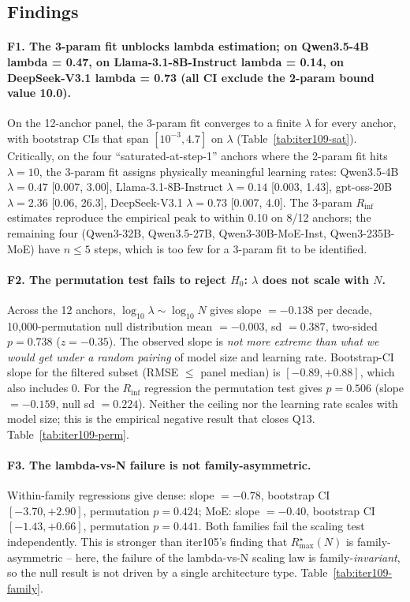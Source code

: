 \subsection*{Findings}

\paragraph{F1. The 3-param fit unblocks lambda estimation; on Qwen3.5-4B lambda = 0.47, on Llama-3.1-8B-Instruct lambda = 0.14, on DeepSeek-V3.1 lambda = 0.73 (all CI exclude the 2-param bound value 10.0).}
On the 12-anchor panel, the 3-param fit converges to a finite $\lambda$ for every anchor, with bootstrap CIs that span $[10^{-3}, 4.7]$ on $\lambda$ (Table~\ref{tab:iter109-sat}).  Critically, on the four ``saturated-at-step-1'' anchors where the 2-param fit hits $\lambda = 10$, the 3-param fit assigns physically meaningful learning rates: Qwen3.5-4B $\lambda = 0.47$ [0.007, 3.00], Llama-3.1-8B-Instruct $\lambda = 0.14$ [0.003, 1.43], gpt-oss-20B $\lambda = 2.36$ [0.06, 26.3], DeepSeek-V3.1 $\lambda = 0.73$ [0.007, 4.0].  The 3-param $R_\mathrm{inf}$ estimates reproduce the empirical peak to within 0.10 on 8/12 anchors; the remaining four (Qwen3-32B, Qwen3.5-27B, Qwen3-30B-MoE-Inst, Qwen3-235B-MoE) have $n \le 5$ steps, which is too few for a 3-param fit to be identified.

\paragraph{F2. The permutation test fails to reject $H_0$: $\lambda$ does not scale with $N$.}
\label{par:f2-lambda-perm}
Across the 12 anchors, $\log_{10}\lambda \sim \log_{10} N$ gives
slope $= -0.138$ per decade, 10{,}000-permutation null distribution
mean $= -0.003$, sd $= 0.387$, two-sided $p = 0.738$ ($z = -0.35$).
The observed slope is \emph{not more extreme than what we would get
under a random pairing} of model size and learning rate.  Bootstrap-CI
slope for the filtered subset (RMSE $\le$ panel median) is
$[-0.89, +0.88]$, which also includes 0.  For the $R_\mathrm{inf}$
regression the permutation test gives $p = 0.506$ (slope $= -0.159$,
null sd $= 0.224$).  Neither the ceiling nor the learning rate scales
with model size; this is the empirical negative result that closes
Q13.  Table~\ref{tab:iter109-perm}.

\paragraph{F3. The lambda-vs-N failure is not family-asymmetric.}
Within-family regressions give dense: slope $= -0.78$, bootstrap CI
$[-3.70, +2.90]$, permutation $p = 0.424$; MoE: slope $= -0.40$,
bootstrap CI $[-1.43, +0.66]$, permutation $p = 0.441$.  Both families
fail the scaling test independently.  This is stronger than iter105's
finding that $R_\mathrm{max}^\star(N)$ is family-asymmetric -- here,
the failure of the lambda-vs-N scaling law is family-\emph{invariant},
so the null result is not driven by a single architecture type.
Table~\ref{tab:iter109-family}.

